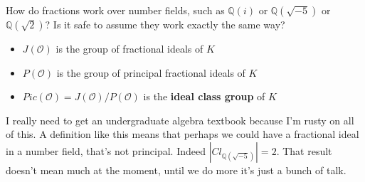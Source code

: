 \documentclass[12pt]{article}
\begin{document}
How do fractions work over number fields, such as $\mathbb{Q}(i)$ or $\mathbb{Q}(\sqrt{-5})$ or $\mathbb{Q}(\sqrt{2})$?  Is it safe to assume they work exactly the same way?
\begin{itemize}
\item $J(\mathcal{O})$ is the group of fractional ideals of $K$
\item $P(\mathcal{O})$ is the group of principal fractional ideals of $K$
\item $Pic(\mathcal{O}) =  J(\mathcal{O})/P(\mathcal{O})$ is the \textbf{ideal class group} of $K$
\end{itemize}
I really need to get an undergraduate algebra textbook because I'm rusty on all of this.  A definition like this means that perhaps we could have a fractional ideal in a number field, that's not principal.  Indeed $|Cl_{\mathbb{Q}(\sqrt{-5})}|=2$.  That result doesn't mean much at the moment, until we do more it's just a bunch of talk.

\newpage
\end{document}
